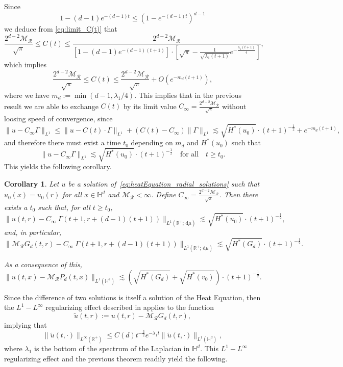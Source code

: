 \documentclass[12pt,longbibliography]{article}
\def\R{\mathbb{R}}
\def\d{\,\mathrm{d}}
\def\R{\mathbb{R}}
\def\d{\,\mathrm{d}}
\def\H{\mathbb{H}}
\newtheorem{cor}[thm]{Corollary}
\theoremstyle{definition}
\theoremstyle{remark}
\theoremstyle{example}
\begin{document}
Since
	\[
	1-(d-1)e^{-(d-1)t}\leq \left(1-e^{-(d-1)t}\right)^{d-1}
	\]
	we deduce from \eqref{eq:limit_C(t)} that
	\[
	\frac{2^{d-2}\mathcal{M}_{\mathcal{R}}}{\sqrt{\pi} }\leq C(t)\leq \frac{2^{d-2}\mathcal{M}_{\mathcal{R}}}{\left[1-(d-1)e^{-(d-1)(t+1)}\right]\cdot\left[\sqrt{\pi} - \frac{1}{\sqrt{\lambda_1 (t+1)}}e^{-\frac{\lambda_1 (t+1)}{4}}\right]},
	\]
	which implies
	\[
	\frac{2^{d-2}\mathcal{M}_{\mathcal{R}}}{\sqrt{\pi} }\leq C(t)\leq \frac{2^{d-2}\mathcal{M}_{\mathcal{R}}}{\sqrt{\pi}} + O(e^{-m_d(t+1)}),
	\]
	where we have $m_d := \min \left(d-1, \lambda_1 /4\right).$ This implies that in the previous result we are able to exchange $C(t)$ by its limit value $C_\infty = \frac{2^{d-2}\mathcal{M}_{\mathcal{R}}}{\sqrt{\pi}}$ without loosing speed of convergence, since
	\[
	\| u- C_\infty\Gamma \|_{L^1} \leq \| u - C(t)\cdot\Gamma \|_{L^1} + (C(t)-C_\infty)\|\Gamma \|_{L^1} \lesssim \sqrt{H^*(u_0)}\cdot (t+1)^{-\frac{1}{2}} + e^{-m_d(t+1)},
	\]
	and therefore there must exist a time $t_0$ depending on $m_d$ and $H^*(u_0)$ such that
	\[
	\| u- C_\infty\Gamma \|_{L^1} \lesssim  \sqrt{H^*(u_0)}\cdot (t+1)^{-\frac{1}{2}}\quad\text{for all}\quad t\geq t_0.
	\]
	This yields the following corollary.
	\begin{cor}\label{cor:L^1_radially_symmetric_asymptotic}
		Let $u$ be a solution of~\eqref{eq:heatEquation_radial_solutions} such that $u_0(x)=u_0(r)$ for all $x\in\H^d$ and $\mathcal{M}_{\mathcal{R}}<\infty$. Define $C_\infty = \frac{2^{d-2}\mathcal{M}_{\mathcal{R}}}{\sqrt{\pi}}$. Then there exists a $t_0$ such that, for all $t\geq t_0$,
		\[
		\| u(t,r) - C_\infty\ \Gamma(t+1, r+(d-1)(t+1)) \|_{L^1(\R^+; \d\mu)}  \lesssim \sqrt{H^*(u_0)}\cdot (t+1)^{-\frac{1}{2}},
		\]
		and, in particular,
		\[
		\|\mathcal{M}_{\mathcal{R}} G_d(t,r) - C_\infty\ \Gamma(t+1, r+(d-1)(t+1))  \|_{L^1(\R^+; \d\mu)}\lesssim\sqrt{H^*(G_d)} \cdot (t+1)^{-\frac{1}{2}}.
		\]
		
		As a consequence of this,
		\[
		\| u(t,x) - \mathcal{M}_{\mathcal{R}}P_d(t,x)  \|_{L^1(\mathbb{H}^d)}\lesssim \left(\sqrt{H^*(G_d)}+\sqrt{H^*(v_0)}\right) \cdot (t+1)^{-\frac{1}{2}}.
		\]
	\end{cor}
	
Since the difference of two solutions is itself a solution of the Heat Equation, then the $L^1-L^\infty$ regularizing effect described in \cite[Proposition 2.3]{vazquez1992asymptotic} applies to the function
\[
\tilde u(t,r):= u(t, r)- \mathcal{M}_{\mathcal{R}}G_d(t,r),
\]
implying that
\[
\|\tilde{u}(t,\cdot)\|_{L^\infty(\R^+)}\leq C(d)t^{-\frac{3}{2}}e^{-\lambda_1 t}\|\tilde{u}(t,\cdot)\|_{L^1(\mathbb{H}^d)},
\]
where $\lambda_1$ is the bottom of the spectrum of the Laplacian in $\mathbb{H}^d$. This $L^1-L^\infty$ regularizing effect and the previous theorem readily yield the following.
\end{document}

